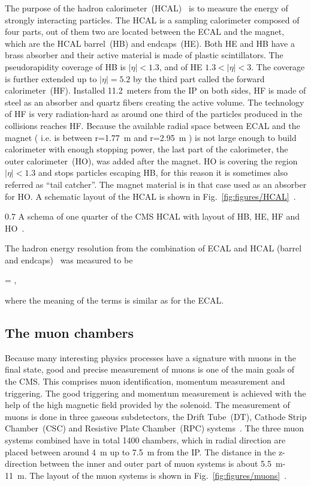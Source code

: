 The purpose of the hadron calorimeter~(HCAL)~\cite{tdrHCAL} is to measure the energy of strongly interacting particles.  The HCAL is a sampling calorimeter composed of four parts, out of them two are located between the ECAL and the magnet, which are the HCAL barrel~(HB) and endcaps~(HE). Both HE and HB have a brass absorber and their active material is made of plastic scintillators. The pseudorapidity coverage of HB is $|\eta|<1.3$, and of HE $1.3<|\eta|<3$. The coverage is further extended up to $|\eta|=5.2$ by the third part called the forward calorimeter~(HF). Installed 11.2~meters from the IP on both sides, HF is made of steel as an absorber and quartz fibers creating the active volume. The technology of HF is very radiation-hard as around one third of the particles produced in the collisions reaches HF. Because the available radial space between ECAL and the magnet ( i.e. is between r=1.77~m and r=2.95~m ) is not large enough to build calorimeter with enough stopping power, the last part of the calorimeter, the outer calorimeter~(HO), was added after the magnet. HO is covering the region $|\eta|<1.3$ and stops particles escaping HB, for this reason it is sometimes also referred as ``tail catcher''. The magnet material is in that case used as an absorber for HO. A schematic layout of the HCAL is shown in Fig.~\ref{fig:figures/HCAL}~\cite{Chatrchyan:2008aa}.

                 {0.7}       
                 {A schema of one quarter of the CMS HCAL with layout of HB, HE, HF and HO~\cite{Chatrchyan:2008aa}. }

The hadron energy resolution from the combination of ECAL and HCAL (barrel and endcaps)~\cite{Chatrchyan:2009ag} was measured to be


{
  =   ,
}

where the meaning of the terms is similar as for the ECAL.

\subsection{The muon chambers}

Because many interesting physics processes have a signature with muons in the final state, good and precise measurement of muons is one of the main goals of the CMS. This comprises muon identification, momentum measurement and triggering. The good triggering and momentum measurement is achieved with the help of the high magnetic field provided by the solenoid. The measurement of muons is done in three gaseous subdetectors, the Drift Tube~(DT), Cathode Strip Chamber~(CSC) and Resistive Plate Chamber~(RPC) systems~\cite{tdrMuon}. The three muon systems combined have in total 1400 chambers, which in radial direction are placed between around 4~m up to 7.5~m from the IP. The distance in the z-direction between the inner and outer part of muon systems is about 5.5~m-11~m. The layout of the muon systems is shown in Fig.~\ref{fig:figures/muons}~\cite{Chatrchyan:2013sba}.

